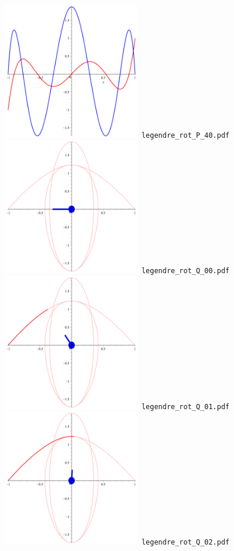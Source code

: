 \documentclass[a4paper]{amsart}
\begin{document}
\includegraphics[width=6cm]{legendre_rot_P_40.pdf}\verb+ legendre_rot_P_40.pdf+\\
\includegraphics[width=6cm]{legendre_rot_Q_00.pdf}\verb+ legendre_rot_Q_00.pdf+\\
\includegraphics[width=6cm]{legendre_rot_Q_01.pdf}\verb+ legendre_rot_Q_01.pdf+\\
\includegraphics[width=6cm]{legendre_rot_Q_02.pdf}\verb+ legendre_rot_Q_02.pdf+\\
\end{document}
